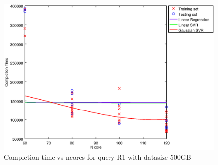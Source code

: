 
\begin {figure}[hbtp]
\centering
\includegraphics[width=\textwidth]{output/R1_500_LINEAR_NCORE/plot_R1_500_bestmodels.eps}
\caption{Completion time vs ncores for query R1 with datasize 500GB}
\label{fig:coreonly_linear_R1_500}
\end {figure}
